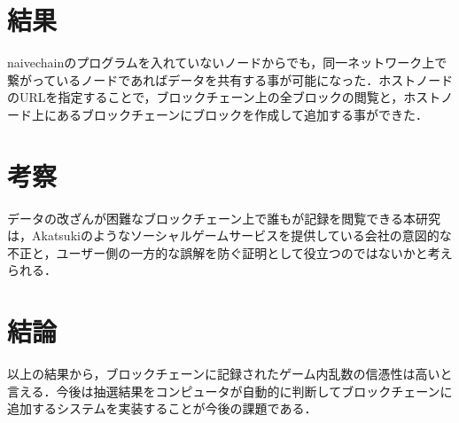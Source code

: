 \documentclass[uplatex,twocolumn,dvipdfmx]{jsarticle}
\begin{document}
\section{結果}

naivechainのプログラムを入れていないノードからでも，同一ネットワーク上で繋がっているノードであればデータを共有する事が可能になった．ホストノードのURLを指定することで，ブロックチェーン上の全ブロックの閲覧と，ホストノード上にあるブロックチェーンにブロックを作成して追加する事ができた．

\section{考察}

データの改ざんが困難なブロックチェーン上で誰もが記録を閲覧できる本研究は，Akatsukiのようなソーシャルゲームサービスを提供している会社の意図的な不正と，ユーザー側の一方的な誤解を防ぐ証明として役立つのではないかと考えられる．


\section{結論}

以上の結果から，ブロックチェーンに記録されたゲーム内乱数の信憑性は高いと言える．今後は抽選結果をコンピュータが自動的に判断してブロックチェーンに追加するシステムを実装することが今後の課題である．





\end{document}
